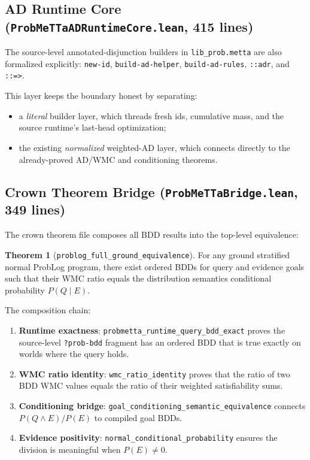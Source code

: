 \documentclass[11pt,a4paper]{article}
\theoremstyle{definition}
\newtheorem{theorem}{Theorem}[section]
\begin{document}
\subsection{AD Runtime Core (\texttt{ProbMeTTaADRuntimeCore.lean}, 415 lines)}

The source-level annotated-disjunction builders in \texttt{lib\_prob.metta}
are also formalized explicitly:
\texttt{new-id}, \texttt{build-ad-helper}, \texttt{build-ad-rules},
\texttt{::adr}, and \texttt{::=>}.

This layer keeps the boundary honest by separating:
\begin{itemize}
\item a \emph{literal} builder layer, which threads fresh ids, cumulative mass,
  and the source runtime's last-head optimization;
\item the existing \emph{normalized} weighted-AD layer, which connects directly
  to the already-proved AD/WMC and conditioning theorems.
\end{itemize}

\subsection{Crown Theorem Bridge (\texttt{ProbMeTTaBridge.lean}, 349 lines)}

The crown theorem file composes all BDD results into the top-level equivalence:

\begin{theorem}[\texttt{problog\_full\_ground\_equivalence}]
For any ground stratified normal ProbLog program, there exist ordered BDDs
for query and evidence goals such that their WMC ratio equals the
distribution semantics conditional probability $P(Q \mid E)$.
\end{theorem}

The composition chain:
\begin{enumerate}
\item \textbf{Runtime exactness}: \texttt{probmetta\_runtime\_query\_bdd\_exact}
      proves the source-level \texttt{?prob-bdd} fragment has an ordered BDD
      that is true exactly on worlds where the query holds.
\item \textbf{WMC ratio identity}: \texttt{wmc\_ratio\_identity} proves that
      the ratio of two BDD WMC values equals the ratio of their weighted
      satisfiability sums.
\item \textbf{Conditioning bridge}: \texttt{goal\_conditioning\_semantic\_equivalence}
      connects $P(Q \wedge E) / P(E)$ to compiled goal BDDs.
\item \textbf{Evidence positivity}: \texttt{normal\_conditional\_probability}
      ensures the division is meaningful when $P(E) \neq 0$.
\end{enumerate}
\end{document}

